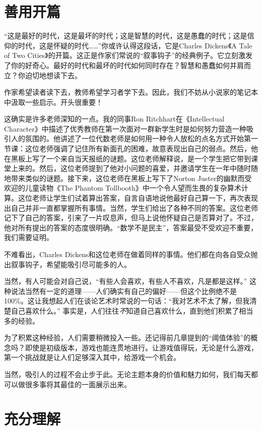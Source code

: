 \section*{善用开篇}

“这是最好的时代，这是最坏的时代；这是智慧的时代，这是愚蠢的时代；这是信仰的时代，这是怀疑的时代……”你或许认得这段话，它是Charles Dickens《A Tale of Two Cities》的开篇。这正是作家们常说的“叙事钩子”的经典例子。它立刻激发了你的好奇心。最好的时代和最坏的时代如何同时存在？智慧和愚蠢如何并肩而立？你迫切地想读下去。

作家希望读者读下去，教师希望学习者学下去。因此，我们不妨从小说家的笔记本中汲取一些启示。开头很重要！

这确实是许多老师深知的一点。我的同事Ron Ritchhart在《Intellectual Character》中描述了优秀教师在第一次面对一群新学生时是如何努力营造一种吸引人的氛围的。他讲述了一位代数老师是如何用一种令人放松的点名方式开始第一节课：这位老师强调了记住所有新面孔的困难，故意表现出自己的弱点。然后，他在黑板上写了一个来自当天报纸的谜题。这位老师解释说，是一个学生把它带到课堂上来的。然后，这位老师提到了他对小问题的喜爱，并邀请学生在一年中随时随地带来类似的谜题。接下来，这位老师在黑板上写下了Norton Juster的幽默而受欢迎的儿童读物《The Phantom Tollbooth》中一个令人望而生畏的复杂算术计算。这位老师让学生们试着算出答案，自言自语地说他最好自己算一下，再次表现出自己并非一直都掌握所有事情。当然，学生们给出了各种不同的答案。这位老师记下了自己的答案，引来了一片叹息声，但马上说他怀疑自己是否算对了。不过，他对所有提出的答案的态度很明确。“数学不是民主”，答案最受不受欢迎不重要，我们需要证明。

不难看出，Charles Dickens和这位老师在做着同样的事情。他们都在向各自受众抛出叙事钩子，希望能吸引尽可能多的人。

当然，有人可能会对自己说，“有些人会喜欢，有些人不喜欢，凡是都是这样。” 这种说法当然有一定的道理——人们确实有自己的偏好——但这个比例绝不是100\%。这让我想起人们在谈论艺术时常说的一句话：“我对艺术不太了解，但我清楚自己喜欢什么。” 事实是，人们往往\textit{不}知道自己喜欢什么，直到他们积累了相当多的经验。

为了积累这种经验，人们需要稍微投入一些。还记得前几章提到的“阈值体验”的概念吗？即使是初级版本，游戏也能连贯地进行。让游戏值得玩，无论是什么游戏，第一个挑战就是让人们足够深入其中，给游戏一个机会。

当然，吸引人的过程不会止步于此。无论主题本身的价值和魅力如何，我们每天都可以做很多事将其最佳的一面展示出来。

\section*{充分理解}

